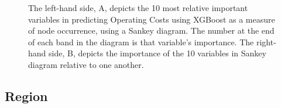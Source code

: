 \documentclass[review,12pt,authoryear]{elsarticle}
\begin{document}
\begin{linenumbers}
\begin{figure}[htb]
  \caption{The left-hand side, A,  depicts the 10 most relative  important variables in predicting Operating Costs using XGBoost as a measure of node occurrence, using a Sankey diagram. The number at the end of each band in the diagram is that variable's importance. The right-hand side, B, depicts the importance of the 10 variables in Sankey diagram relative to one another.}\label{fig:operating_costs_sankey}
 \end{figure}


\subsection{Region}

 



\end{linenumbers}
\end{document}
